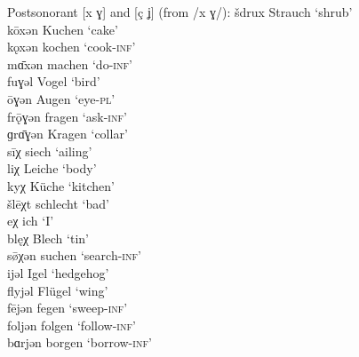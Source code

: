 \ea%
\label{ex:5:33}Postsonorant [x ɣ] and [ç ʝ] (from /x ɣ/):
\ea\label{ex:5:33a}   šdrux     \tab [ʃtrux]    \tab Strauch  \tab ‘shrub’             \\
      kōxən     \tab [koːxǝn]   \tab Kuchen   \tab ‘cake’              \\
      kǫxən     \tab [kɔxǝn]    \tab kochen   \tab ‘cook-\textsc{inf}’ \\
      mɑ̄xən     \tab [mɑːxǝn]   \tab machen   \tab ‘do-\textsc{inf}’   \\
\ex\label{ex:5:33b}   fuɣəl     \tab [fuɣǝl]    \tab Vogel    \tab ‘bird’              \\
      ōɣən      \tab [oːɣǝn]    \tab Augen    \tab ‘eye-\textsc{pl}’              \\
      frǭɣən    \tab [frɔːɣǝn]  \tab fragen   \tab ‘ask-\textsc{inf}’  \\
      ɡrɑ̄ɣən    \tab [grɑːɣǝn]  \tab Kragen   \tab ‘collar’            \\
\ex\label{ex:5:33c}   sīχ       \tab [siːç]     \tab siech    \tab ‘ailing’            \\
      liχ       \tab [lɪç]      \tab Leiche   \tab ‘body’              \\
      kyχ       \tab [kyç]      \tab Küche    \tab ‘kitchen’           \\
      šlēχt     \tab [ʃleːç]    \tab schlecht \tab ‘bad’               \\
      eχ        \tab [eç]       \tab ich      \tab ‘I’                 \\
      blęχ      \tab [blɛç]     \tab Blech    \tab ‘tin’               \\
      s\={ø}χən \tab [søːçǝn]   \tab suchen   \tab ‘search-\textsc{inf}’ \\
\ex\label{ex:5:33d}   ijəl      \tab [ɪʝǝl]     \tab Igel     \tab ‘hedgehog’            \\
      flyjəl    \tab [flyʝǝl]   \tab Flügel   \tab ‘wing’                \\
      fējən     \tab [feːʝǝn]   \tab fegen    \tab ‘sweep-\textsc{inf}’  \\
\ex\label{ex:5:33e}   foljən    \tab [fɔlʝǝn]   \tab folgen   \tab ‘follow-\textsc{inf}’ \\
      bɑrjən    \tab [bɑrʝǝn]   \tab borgen   \tab ‘borrow-\textsc{inf}’ \\
  \z
\z 

